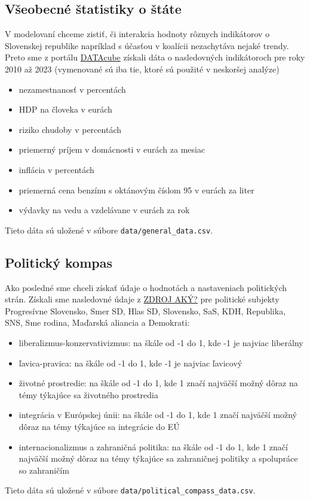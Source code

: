 \documentclass[main.tex]{subfiles}
\begin{document}
\subsection{Všeobecné štatistiky o štáte}

V modelovaní chceme zistiť, či interakcia hodnoty rôznych indikátorov o Slovenskej republike napríklad s účasťou v koalícii nezachytáva nejaké trendy. Preto sme z portálu \href{https://datacube.statistics.sk/}{DATAcube} získali dáta o nasledovných indikátoroch pre roky 2010 až 2023 (vymenované sú iba tie, ktoré sú použité v neskoršej analýze)

\begin{itemize}
	\item nezamestnanosť v percentách
	\item HDP na človeka v eurách
	\item riziko chudoby v percentách
	\item priemerný príjem v domácnosti v eurách za mesiac
	\item inflácia v percentách
	\item priemerná cena benzínu s oktánovým číslom 95 v eurách za liter
	\item výdavky na vedu a vzdelávane v eurách za rok
\end{itemize}

Tieto dáta sú uložené v súbore \verb*|data/general_data.csv|.

\subsection{Politický kompas}

Ako posledné sme chceli získať údaje o hodnotách a nastaveniach politických strán. Získali sme nasledovné údaje z \href{www.google.com}{\LARGE ZDROJ AKÝ?} pre politické subjekty Progresívne Slovensko, Smer SD, Hlas SD, Slovensko, SaS, KDH, Republika, SNS, Sme rodina, Maďarská aliancia a Demokrati:

\begin{itemize}
	\item liberalizmus-konzervativizmus: na škále od -1 do 1, kde -1 je najviac liberálny
	\item ľavica-pravica: na škále od -1 do 1, kde -1 je najviac ľavicový
	\item životné prostredie: na škále od -1 do 1, kde 1 značí najväčší možný dôraz na témy týkajúce sa životného prostredia
	\item integrácia v Európskej únii: na škále od -1 do 1, kde 1 značí najväčší možný dôraz na témy týkajúce sa integrácie do EÚ
	\item internacionalizmus a zahraničná politika: na škále od -1 do 1, kde 1 značí najväčší možný dôraz na témy týkajúce sa zahraničnej politiky a spolupráce so zahraničím
\end{itemize}

Tieto dáta sú uložené v súbore \verb*|data/political_compass_data.csv|.
\end{document}
